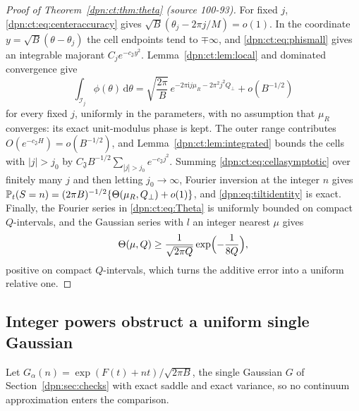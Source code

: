 \documentclass[11pt]{article}
\numberwithin{equation}{section}
\theoremstyle{definition}\newtheorem{definition}[theorem]{Definition}
\theoremstyle{remark}\newtheorem{remark}[theorem]{Remark}
\newcommand{\dd}{\,\mathrm d}\newcommand{\ii}{\mathrm i}
\newcommand{\src}[1]{\textup{(source #1)}}
\begin{document}
\begin{proof}[Proof of Theorem~\ref{dpn:ct:thm:theta} \src{100-93}]
For fixed $j$, \eqref{dpn:ct:eq:centeraccuracy} gives
$\sqrt B(\theta_j-2\pi j/M)=o(1)$.  In the coordinate $y=\sqrt B(\theta-\theta_j)$
the cell endpoints tend to $\mp\infty$, and \eqref{dpn:ct:eq:phismall} gives an
integrable majorant $C_je^{-c_{\mathfrak J}y^2}$.  Lemma~\ref{dpn:ct:lem:local}
and dominated convergence give
\begin{equation}\label{dpn:ct:eq:cellasymptotic}
 \int_{\mathcal I_j}\phi(\theta)\dd\theta
 =\sqrt{\frac{2\pi}B}\,e^{-2\pi\ii j\mu_R-2\pi^2j^2Q_\perp}+o(B^{-1/2})
\end{equation}
for every fixed $j$, uniformly in the parameters, with no assumption that
$\mu_R$ converges: its exact unit-modulus phase is kept.  The outer range
contributes $O(e^{-c_{\mathfrak J}H})=o(B^{-1/2})$, and
Lemma~\ref{dpn:ct:lem:integrated} bounds the cells with $|j|>j_0$ by
$C_{\mathfrak J}B^{-1/2}\sum_{|j|>j_0}e^{-c_{\mathfrak J}j^2}$.  Summing
\eqref{dpn:ct:eq:cellasymptotic} over finitely many $j$ and then letting
$j_0\to\infty$, Fourier inversion at the integer $n$ gives
$\mathbb P_t(S=n)=(2\pi B)^{-1/2}\{\Theta(\mu_R,Q_\perp)+o(1)\}$, and
\eqref{dpn:eq:tiltidentity} is exact.  Finally, the Fourier series in
\eqref{dpn:ct:eq:Theta} is uniformly bounded on compact $Q$-intervals, and the
Gaussian series with $l$ an integer nearest $\mu$ gives
\begin{equation}\label{dpn:ct:eq:thetalower}
 \Theta(\mu,Q)\ge\frac1{\sqrt{2\pi Q}}\exp\Bigl(-\frac1{8Q}\Bigr),
\end{equation}
positive on compact $Q$-intervals, which turns the additive error into a
uniform relative one.
\end{proof}

\subsection{Integer powers obstruct a uniform single Gaussian}\label{dpn:ct:sec:obstruction}
Let $G_\alpha(n)=\exp(F(t)+nt)/\sqrt{2\pi B}$, the single Gaussian $G$ of
Section~\ref{dpn:sec:checks} with exact saddle and exact variance, so no
continuum approximation enters the comparison.
\end{document}
